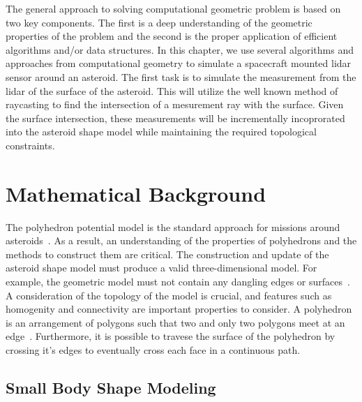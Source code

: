 The general approach to solving computational geometric problem is based on two key components.
The first is a deep understanding of the geometric properties of the problem and the second is the proper application of efficient algorithms and/or data structures.
In this chapter, we use several algorithms and approaches from computational geometry to simulate a spacecraft mounted \gls{lidar} sensor around an asteroid.
The first task is to simulate the measurement from the \gls{lidar} of the surface of the asteroid.
This will utilize the well known method of \gls{raycasting} to find the intersection of a mesurement ray with the surface.
Given the surface intersection, these measurements will be incrementally incoprorated into the asteroid shape model while maintaining the required topological constraints.

\section{Mathematical Background}

The \gls{polyhedron} potential model is the standard approach for missions around asteroids~\cite{werner1994,werner1996}.
As a result, an understanding of the properties of \glspl{polyhedron} and the methods to construct them are critical.
The construction and update of the asteroid shape model must produce a valid three-dimensional model.
For example, the geometric model must not contain any dangling edges or surfaces~\cite{mortenson1997}.
A consideration of the topology of the model is crucial, and features such as homogenity and connectivity are important properties to consider.
A \gls{polyhedron} is an arrangement of \glspl{polygon} such that two and only two \glspl{polygon} meet at an edge~\cite{mortenson1997}.
Furthermore, it is possible to travese the surface of the \gls{polyhedron} by crossing it's edges to eventually cross each face in a continuous path.

\subsection{Small Body Shape Modeling}\label{sec:shape_model}

